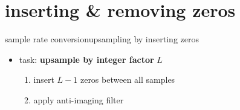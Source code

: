        \section{inserting \& removing zeros}
	\begin{frame}{sample rate conversion}{upsampling by inserting zeros}
        \vspace{-3mm}
        \begin{itemize}
            \item   task: \textbf{upsample by integer factor} $L$
            \pause 
            \begin{enumerate}
                \item   insert $L-1$ zeros between all samples
                \item   apply anti-imaging filter
            \end{enumerate}
        \end{itemize}
    \end{frame}

